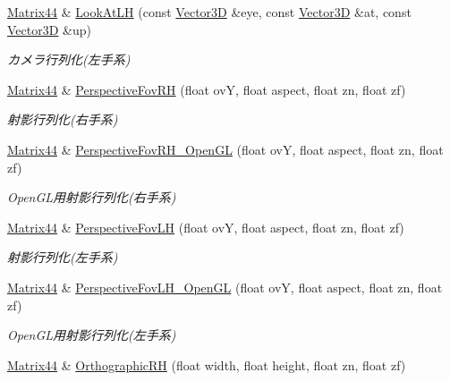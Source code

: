 \begin{DoxyCompactItemize}
\mbox{\hyperlink{struct_effekseer_1_1_matrix44}{Matrix44}} \& \mbox{\hyperlink{struct_effekseer_1_1_matrix44_ade916ab8e0c99fe658b9d089d2bd55b9}{Look\+At\+LH}} (const \mbox{\hyperlink{struct_effekseer_1_1_vector3_d}{Vector3D}} \&eye, const \mbox{\hyperlink{struct_effekseer_1_1_vector3_d}{Vector3D}} \&at, const \mbox{\hyperlink{struct_effekseer_1_1_vector3_d}{Vector3D}} \&up)
\begin{DoxyCompactList}\small\item\em カメラ行列化(左手系) \end{DoxyCompactList}\item 
\mbox{\hyperlink{struct_effekseer_1_1_matrix44}{Matrix44}} \& \mbox{\hyperlink{struct_effekseer_1_1_matrix44_a0deeef1c9ef11e08b34d72d8cc1907a1}{Perspective\+Fov\+RH}} (float ovY, float aspect, float zn, float zf)
\begin{DoxyCompactList}\small\item\em 射影行列化(右手系) \end{DoxyCompactList}\item 
\mbox{\hyperlink{struct_effekseer_1_1_matrix44}{Matrix44}} \& \mbox{\hyperlink{struct_effekseer_1_1_matrix44_a7d8f52cbf92efe51564a2314a212df78}{Perspective\+Fov\+R\+H\+\_\+\+Open\+GL}} (float ovY, float aspect, float zn, float zf)
\begin{DoxyCompactList}\small\item\em Open\+G\+L用射影行列化(右手系) \end{DoxyCompactList}\item 
\mbox{\hyperlink{struct_effekseer_1_1_matrix44}{Matrix44}} \& \mbox{\hyperlink{struct_effekseer_1_1_matrix44_a01facdf54829125dfefa4b1f29210c74}{Perspective\+Fov\+LH}} (float ovY, float aspect, float zn, float zf)
\begin{DoxyCompactList}\small\item\em 射影行列化(左手系) \end{DoxyCompactList}\item 
\mbox{\hyperlink{struct_effekseer_1_1_matrix44}{Matrix44}} \& \mbox{\hyperlink{struct_effekseer_1_1_matrix44_a6772f3ebb3a465742d6abde9a1e823ac}{Perspective\+Fov\+L\+H\+\_\+\+Open\+GL}} (float ovY, float aspect, float zn, float zf)
\begin{DoxyCompactList}\small\item\em Open\+G\+L用射影行列化(左手系) \end{DoxyCompactList}\item 
\mbox{\hyperlink{struct_effekseer_1_1_matrix44}{Matrix44}} \& \mbox{\hyperlink{struct_effekseer_1_1_matrix44_ac625feac179fd69f95a68d4382fa9e7a}{Orthographic\+RH}} (float width, float height, float zn, float zf)

\end{DoxyCompactItemize}

